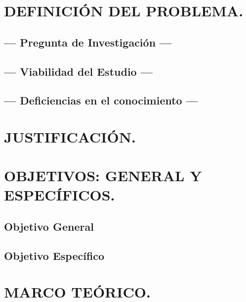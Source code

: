 \documentclass{amsart}
\author{}
\title{}
\begin{document}
\maketitle

\section{DEFINICIÓN DEL PROBLEMA.} %
\label{sec:definicion}

\subsection{--- Pregunta de Investigación ---} %
\label{sub:pregunta}

\subsection{--- Viabilidad del Estudio ---} %
\label{sub:viabilidad}

\subsection{--- Deficiencias en el conocimiento ---} %
\label{sub:deficiencias}


\section{JUSTIFICACIÓN.} %
\label{sec:justificacion}

\section{OBJETIVOS: GENERAL Y ESPECÍFICOS.} %
\label{sec:objetivos}

\subsection{Objetivo General} %
\label{sub:obj_general}

\subsection{Objetivo Específico} %
\label{sub:obj_especifico}


\section{MARCO TEÓRICO.} %
\label{sec:marco_teorico}
\end{document}
